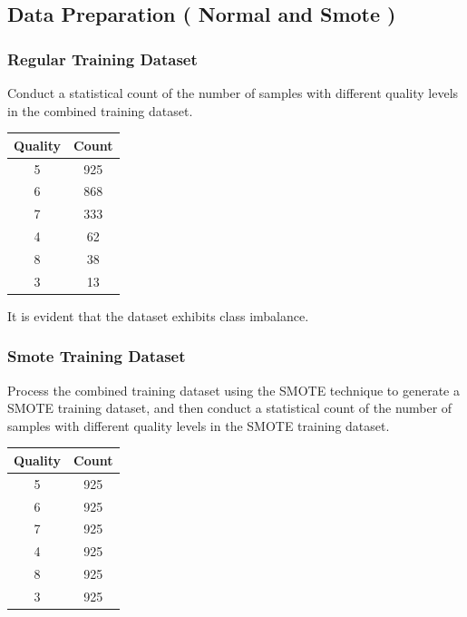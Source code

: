 \subsection{Data Preparation ( Normal and Smote )}\phantom{...}

\subsubsection{Regular Training Dataset}\phantom{...}

Conduct a statistical count of the number of samples with different quality levels in the combined training dataset.

\begin{center}
	\begin{tabular}{|c|c|}
		\hline
		Quality & Count \\
		\hline
		5 & 925 \\
		6 & 868 \\
		7 & 333 \\
		4 & 62 \\
		8 & 38 \\
		3 & 13 \\
		\hline
	\end{tabular}
\end{center}

It is evident that the dataset exhibits class imbalance.

\subsubsection{Smote Training Dataset}\phantom{...}

Process the combined training dataset using the SMOTE technique to generate a SMOTE training dataset, and then conduct a statistical count of the number of samples with different quality levels in the SMOTE training dataset.

\begin{center}
	\begin{tabular}{|c|c|}
		\hline
		Quality & Count \\
		\hline
		5 & 925 \\
		6 & 925 \\
		7 & 925 \\
		4 & 925 \\
		8 & 925 \\
		3 & 925 \\
		\hline
	\end{tabular}
\end{center}

